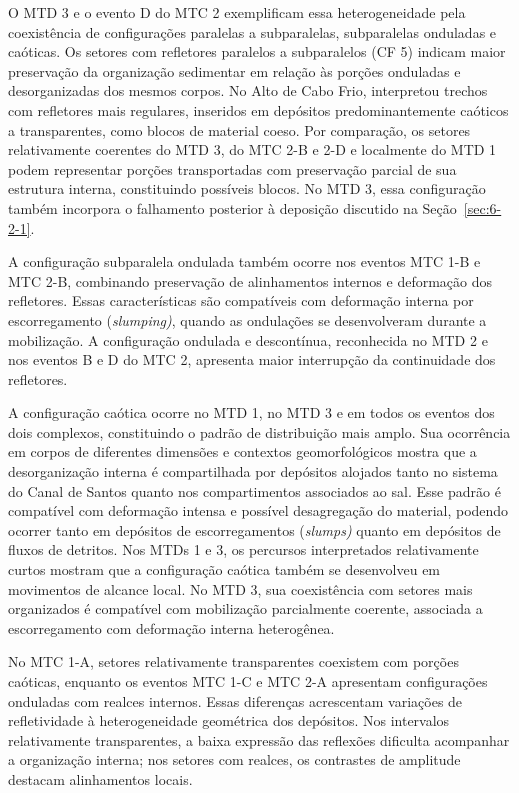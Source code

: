 O MTD 3 e o evento D do MTC 2 exemplificam essa heterogeneidade pela coexistência de configurações paralelas a subparalelas, subparalelas onduladas e caóticas. Os setores com refletores paralelos a subparalelos (CF 5) indicam maior preservação da organização sedimentar em relação às porções onduladas e desorganizadas dos mesmos corpos. No Alto de Cabo Frio,  interpretou trechos com refletores mais regulares, inseridos em depósitos predominantemente caóticos a transparentes, como blocos de material coeso. Por comparação, os setores relativamente coerentes do MTD 3, do MTC 2-B e 2-D e localmente do MTD 1 podem representar porções transportadas com preservação parcial de sua estrutura interna, constituindo possíveis blocos. No MTD 3, essa configuração também incorpora o falhamento posterior à deposição discutido na Seção~\ref{sec:6-2-1}.

A configuração subparalela ondulada também ocorre nos eventos MTC 1-B e MTC 2-B, combinando preservação de alinhamentos internos e deformação dos refletores. Essas características são compatíveis com deformação interna por escorregamento (\textit{slumping)}, quando as ondulações se desenvolveram durante a mobilização. A configuração ondulada e descontínua, reconhecida no MTD 2 e nos eventos B e D do MTC 2, apresenta maior interrupção da continuidade dos refletores.

A configuração caótica ocorre no MTD 1, no MTD 3 e em todos os eventos dos dois complexos, constituindo o padrão de distribuição mais amplo. Sua ocorrência em corpos de diferentes dimensões e contextos geomorfológicos mostra que a desorganização interna é compartilhada por depósitos alojados tanto no sistema do Canal de Santos quanto nos compartimentos associados ao sal. Esse padrão é compatível com deformação intensa e possível desagregação do material, podendo ocorrer tanto em depósitos de escorregamentos (\textit{slumps)} quanto em depósitos de fluxos de detritos. Nos MTDs 1 e 3, os percursos interpretados relativamente curtos mostram que a configuração caótica também se desenvolveu em movimentos de alcance local. No MTD 3, sua coexistência com setores mais organizados é compatível com mobilização parcialmente coerente, associada a escorregamento com deformação interna heterogênea.

No MTC 1-A, setores relativamente transparentes coexistem com porções caóticas, enquanto os eventos MTC 1-C e MTC 2-A apresentam configurações onduladas com realces internos. Essas diferenças acrescentam variações de refletividade à heterogeneidade geométrica dos depósitos. Nos intervalos relativamente transparentes, a baixa expressão das reflexões dificulta acompanhar a organização interna; nos setores com realces, os contrastes de amplitude destacam alinhamentos locais.

